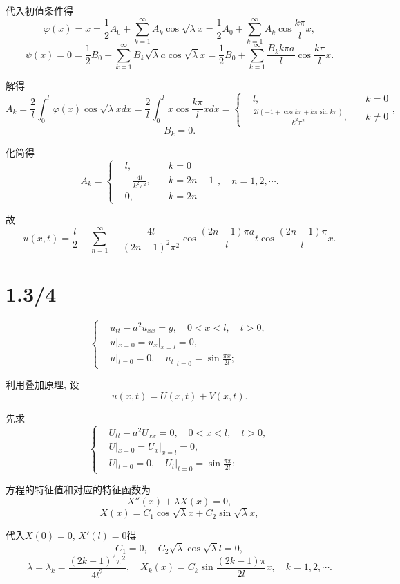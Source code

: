 \documentclass[11pt,a4paper]{article}
\begin{document}
代入初值条件得
$$\varphi(x)=x=\frac{1}{2}A_0+\sum_{k=1}^\infty A_k\cos\sqrt{\lambda}x=\frac{1}{2}A_0+\sum_{k=1}^\infty A_k\cos\frac{k\pi }{l}x,$$
$$\psi(x)=0=\frac{1}{2}B_0+\sum_{k=1}^\infty B_k\sqrt{\lambda}a\cos\sqrt{\lambda}x=\frac{1}{2}B_0+\sum_{k=1}^\infty \frac{B_kk\pi a}{l}\cos\frac{k\pi}{l}x.$$

解得
$$A_k=\frac{2}{l}\int_0^l\varphi(x)\cos\sqrt{\lambda}xdx=\frac{2}{l}\int_0^lx\cos\frac{k\pi}{l}xdx=\left\{\begin{aligned}&l,&\quad k=0\\&\frac{2l(-1+\cos k\pi+k\pi\sin k\pi)}{k^2\pi^2},&\quad k\neq 0\end{aligned}\right.,$$
$$B_k=0.$$

化简得
$$A_k=\left\{\begin{aligned}&l,&\quad k=0\\&-\frac{4l}{k^2\pi^2}, &\quad k = 2n-1 \\ &0, &\quad k=2n \end{aligned}\right.,\quad n=1,2,\cdots.$$

故
$$u(x,t)=\frac{l}{2}+\sum_{n=1}^\infty-\frac{4l}{(2n-1)^2\pi^2}\cos\frac{(2n-1)\pi a}{l}t\cos\frac{(2n-1)\pi}{l}x.$$

\section{1.3/4}

$$
  \left\{\begin{aligned}
     & u_{tt}-a^2u_{xx}=g, \quad 0<x<l,\quad t>0,        \\
     & u|_{x=0}=u_x|_{x=l}=0,                            \\
     & u|_{t=0}=0,\quad u_t|_{t=0}=\sin\frac{\pi x}{2l};
  \end{aligned}\right.
$$

利用叠加原理, 设$$u(x,t)=U(x,t)+V(x,t).$$

先求
$$
  \left\{\begin{aligned}
     & U_{tt}-a^2U_{xx}=0, \quad 0<x<l,\quad t>0,        \\
     & U|_{x=0}=U_x|_{x=l}=0,                            \\
     & U|_{t=0}=0,\quad U_t|_{t=0}=\sin\frac{\pi x}{2l};
  \end{aligned}\right.
$$

方程的特征值和对应的特征函数为
$$X''(x)+\lambda X(x)=0,$$
$$X(x)=C_1\cos\sqrt{\lambda}x+C_2\sin\sqrt{\lambda}x,$$

代入$X(0)=0$, $X'(l)=0$得
$$C_1=0,\quad C_2\sqrt{\lambda}\cos\sqrt{\lambda}l=0,$$
$$\lambda=\lambda_k=\frac{(2k-1)^2\pi^2}{4l^2},\quad X_k(x)=C_k\sin\frac{(2k-1)\pi}{2l}x,\quad k=1,2,\cdots.$$
\end{document}
